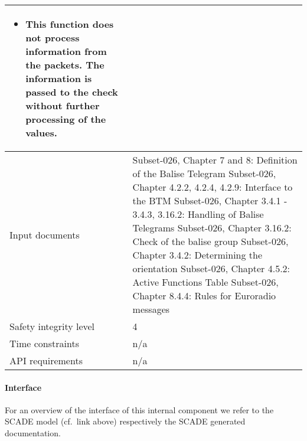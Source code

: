 \begin{longtable}{p{}p{}}
\begin{itemize}
\item This function does not process information from the packets. The information is passed to the check without further processing of the values. 
\end{itemize} \\
\midrule
Input documents	&
  Subset-026, Chapter 7 and 8: Definition of the Balise Telegram\newline
  Subset-026, Chapter 4.2.2, 4.2.4, 4.2.9: Interface to the BTM\newline
  Subset-026, Chapter 3.4.1 - 3.4.3, 3.16.2: Handling of Balise Telegrams\newline
  Subset-026, Chapter 3.16.2: Check of the balise group\newline
  Subset-026, Chapter 3.4.2: Determining the orientation\newline
  Subset-026, Chapter 4.5.2: Active Functions Table\newline
  Subset-026, Chapter 8.4.4: Rules for Euroradio messages \\
\midrule
Safety integrity level		& 4 \\
\midrule
Time constraints		& n/a \\
\midrule
API requirements 		& n/a \\
\bottomrule
\end{longtable}


\paragraph{Interface}

For an overview of the interface of this internal component we refer to the SCADE model (cf.~link above) respectively the SCADE generated documentation.